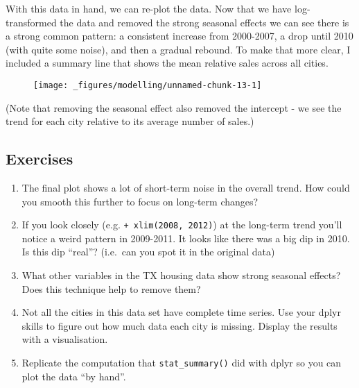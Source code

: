 With this data in hand, we can re-plot the data. Now that we have
log-transformed the data and removed the strong seasonal effects we can
see there is a strong common pattern: a consistent increase from
2000-2007, a drop until 2010 (with quite some noise), and then a gradual
rebound. To make that more clear, I included a summary line that shows
the mean relative sales across all cities.

\begin{Shaded}
\begin{Highlighting}[]
\StringTok{  }\NormalTok{(}\NormalTok{(}  \NormalTok{/}\NormalTok{) +}\StringTok{ }
\StringTok{  }\NormalTok{(} \NormalTok{, } \NormalTok{, } \NormalTok{)}
\end{Highlighting}
\end{Shaded}

\begin{figure}[H]
  \texttt{[image: \_figures/modelling/unnamed-chunk-13-1]}
\end{figure}

(Note that removing the seasonal effect also removed the intercept - we
see the trend for each city relative to its average number of sales.)

\subsection{Exercises}\label{exercises-1}

\begin{enumerate}
\def\labelenumi{\arabic{enumi}.}
\item
  The final plot shows a lot of short-term noise in the overall trend.
  How could you smooth this further to focus on long-term changes?
\item
  If you look closely (e.g. \texttt{+\ xlim(2008,\ 2012)}) at the
  long-term trend you'll notice a weird pattern in 2009-2011. It looks
  like there was a big dip in 2010. Is this dip ``real''? (i.e.~can you
  spot it in the original data)
\item
  What other variables in the TX housing data show strong seasonal
  effects? Does this technique help to remove them?
\item
  Not all the cities in this data set have complete time series. Use
  your dplyr skills to figure out how much data each city is missing.
  Display the results with a visualisation.
\item
  Replicate the computation that \texttt{stat\_summary()} did with dplyr
  so you can plot the data ``by hand''.
\end{enumerate}

